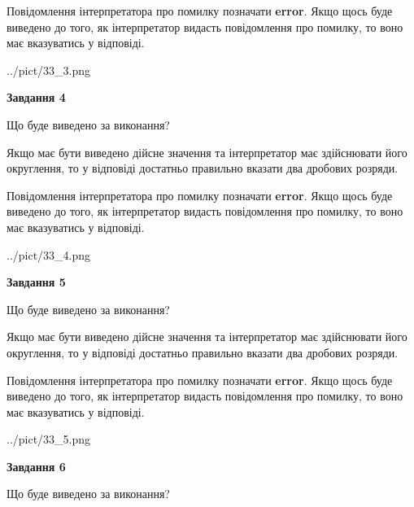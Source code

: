 \documentclass[12pt, ukrainian]{article}
\begin{document}
{\begin {Large}
Повідомлення інтерпретатора про помилку позначати \textbf{error}.
Якщо щось буде виведено до того, як інтерпретатор видасть повідомлення про помилку, 
то воно має вказуватись у відповіді. \par

\begin{center}
	{../pict/33_3.png}
\end{center}
\newpage

{\begin {center}\textbf{Завдання 4}\end {center}}\par
Що буде виведено за виконання? \par

Якщо має бути виведено дійсне значення та інтерпретатор має здійснювати його округлення, 
то у відповіді достатньо правильно вказати два дробових розряди.

Повідомлення інтерпретатора про помилку позначати \textbf{error}.
Якщо щось буде виведено до того, як інтерпретатор видасть повідомлення про помилку, 
то воно має вказуватись у відповіді. \par

\begin{center}
	{../pict/33_4.png}
\end{center}
\newpage

{\begin {center}\textbf{Завдання 5}\end {center}}\par
Що буде виведено за виконання? \par

Якщо має бути виведено дійсне значення та інтерпретатор має здійснювати його округлення, 
то у відповіді достатньо правильно вказати два дробових розряди.

Повідомлення інтерпретатора про помилку позначати \textbf{error}.
Якщо щось буде виведено до того, як інтерпретатор видасть повідомлення про помилку, 
то воно має вказуватись у відповіді. \par

\begin{center}
	{../pict/33_5.png}
\end{center}
\newpage

{\begin {center}\textbf{Завдання 6}\end {center}}\par
Що буде виведено за виконання? \par


\end{Large}}
\end{document}
